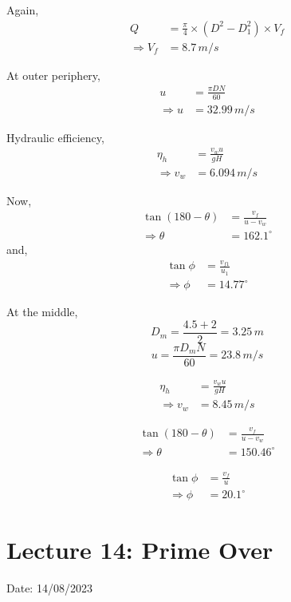 \documentclass{article}
\begin{document}
\begin{multicols}{2}
  Again,
  \begin{align*}
    Q &= \frac{\pi}{4} \times (D^2 - D_1^2) \times V_f \\
    \Rightarrow V_f &= 8.7 \, m/s
  \end{align*}

  At outer periphery,
  \begin{align*}
    u &= \frac{\pi D N}{60} \\
    \Rightarrow u &= 32.99 \, m/s
  \end{align*}

  Hydraulic efficiency,
  \begin{align*}
    \eta_h &= \frac{v_w u}{gH} \\
    \Rightarrow v_w &= 6.094 \, m/s
  \end{align*}

  Now,
  \begin{align*}
    \tan (180 - \theta) &= \frac{v_f}{u - v_w} \\
    \Rightarrow \theta &= 162.1^{\circ}
  \end{align*}
  and,
  \begin{align*}
    \tan \phi &= \frac{v_{f1}}{u_1} \\
    \Rightarrow \phi &= 14.77^{\circ}
  \end{align*}

  At the middle,
  $$D_m = \frac{4.5 + 2}{2} = 3.25 \, m$$
  $$u = \frac{\pi D_m N}{60} = 23.8 \, m/s$$

  \begin{align*}
    \eta_h &= \frac{v_w u}{gH} \\
    \Rightarrow v_w &= 8.45 \, m/s
  \end{align*}
  
  \begin{align*}
    \tan (180 - \theta) &= \frac{v_f}{u - v_w} \\
    \Rightarrow \theta &= 150.46^{\circ}
  \end{align*}

  \begin{align*}
    \tan \phi &= \frac{v_{f}}{u} \\
    \Rightarrow \phi &= 20.1^{\circ}
  \end{align*}
\end{multicols}

\vspace*{1cm}

\section{Lecture 14: Prime Over}
\hfill Date: 14/08/2023
  
\end{document}
